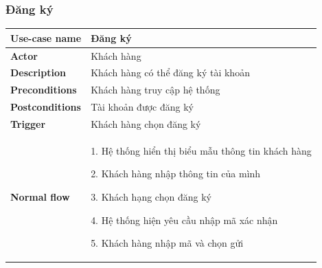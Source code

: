         \subsubsection{Đăng ký}
        {
\setlength\extrarowheight{6pt}
            \begin{longtable}{| p{} | p{} |} 
                \hline
                    \textbf{Use-case name} 
                & 
                    Đăng ký
                \\
                \hline
                    \textbf{Actor} 
                & 
                    Khách hàng
                \\
                \hline
                    \textbf{Description} 
                & 
                  Khách hàng có thể đăng ký tài khoản
                \\
                \hline
                    \textbf{Preconditions} 
                &
                    Khách hàng truy cập hệ thống
                \\
                \hline
                    \textbf{Postconditions} 
                & 
                    Tài khoản được đăng ký
                \\
                \hline
                    \textbf{Trigger} 
                & 
                    Khách hàng chọn đăng ký
                \\
                \hline
                \begin{flushleft}
                    \textbf{Normal flow}
                \end{flushleft}
                & 
                1. Hệ thống hiển thị biểu mẫu thông tin khách hàng
                    
                    2. Khách hàng nhập thông tin của mình
                    
                    3. Khách hạng chọn đăng ký
                    
                    4. Hệ thống hiện yêu cầu nhập mã xác nhận
                    
                    5. Khách hàng nhập mã và chọn gửi
                    

\end{longtable}}
